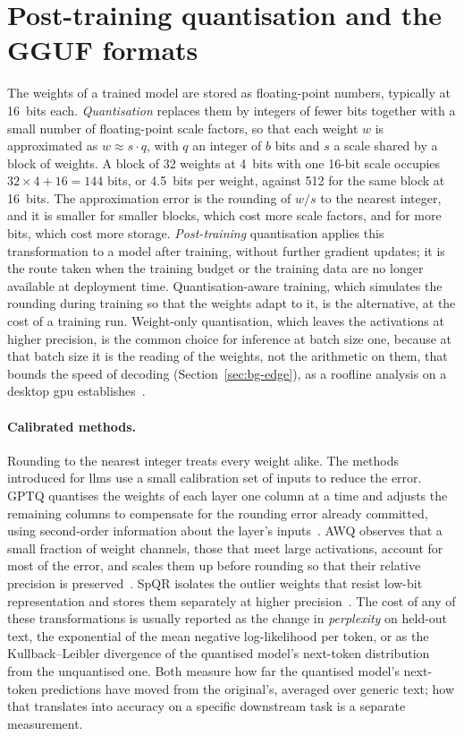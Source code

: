 \section{Post-training quantisation and the GGUF formats}
\label{sec:bg-quant}

The weights of a trained model are stored as floating-point numbers, typically at 16~bits each.
\emph{Quantisation} replaces them by integers of fewer bits together with a small number of
floating-point scale factors, so that each weight $w$ is approximated as $w \approx s \cdot q$,
with $q$ an integer of $b$ bits and $s$ a scale shared by a block of weights. A block of 32
weights at 4~bits with one 16-bit scale occupies $32 \times 4 + 16 = 144$ bits, or 4.5~bits per
weight, against 512 for the same block at 16~bits. The approximation error is the rounding of $w/s$
to the nearest integer, and it is smaller for smaller blocks, which cost more scale factors, and
for more bits, which cost more storage. \emph{Post-training} quantisation applies this
transformation to a model after training, without further gradient updates; it is the route taken
when the training budget or the training data are no longer available at deployment time.
Quantisation-aware training, which simulates the rounding during training so that the weights
adapt to it, is the alternative, at the cost of a training run. Weight-only quantisation, which
leaves the activations at higher precision, is the common choice for inference at batch size one,
because at that batch size it is the reading of the weights, not the arithmetic on them, that
bounds the speed of decoding (Section~\ref{sec:bg-edge}), as a roofline analysis on a desktop
\gls{gpu} establishes~\cite{awq}.

\paragraph{Calibrated methods.} Rounding to the nearest integer treats every weight alike. The
methods introduced for \glspl{llm} use a small calibration set of inputs to reduce the error.
GPTQ quantises the weights of each layer one column at a time and adjusts the remaining columns to
compensate for the rounding error already committed, using second-order information about the
layer's inputs~\cite{gptq}. AWQ observes that a small fraction of weight channels, those that meet
large activations, account for most of the error, and scales them up before rounding so that
their relative precision is preserved~\cite{awq}. SpQR isolates the outlier weights that resist
low-bit representation and stores them separately at higher precision~\cite{spqr}. The cost of
any of these transformations is usually reported as the change in \emph{perplexity} on held-out
text, the exponential of the mean negative log-likelihood per token, or as the Kullback--Leibler
divergence of the quantised model's next-token distribution from the unquantised one. Both
measure how far the quantised model's next-token predictions have moved from the original's,
averaged over generic text; how that translates into accuracy on a specific downstream task is a
separate measurement.

